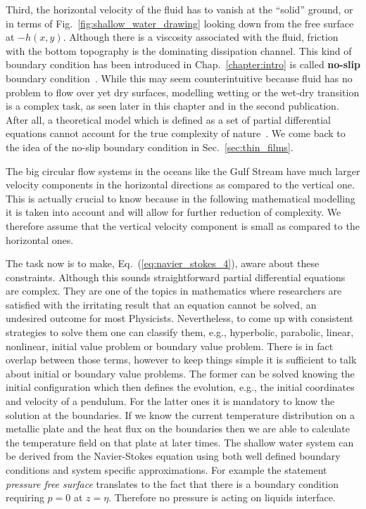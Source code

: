 Third, the horizontal velocity of the fluid has to vanish at the ``solid'' ground, or in terms of Fig.~\ref{fig:shallow_water_drawing} looking down from the free surface at $-h(x,y)$.
Although there is a viscosity associated with the fluid, friction with the bottom topography is the dominating dissipation channel.
This kind of boundary condition has been introduced in Chap.~\ref{chapter:intro} is called \textbf{no-slip} boundary condition~\cite{richardsonNoslipBoundaryCondition1973, degennesFluidWallSlippage2002, salmonLatticeBoltzmannMethod1999}.
While this may seem counterintuitive because fluid has no problem to flow over yet dry surfaces, modelling wetting or the wet-dry transition is a complex task, as seen later in this chapter and in the second publication.
After all, a theoretical model which is defined as a set of partial differential equations cannot account for the true complexity of nature~\cite{scrivenPhysicsApplicationsDIP1988}.
We come back to the idea of the no-slip boundary condition in Sec.~\ref{sec:thin_films}.

The big circular flow systems in the oceans like the Gulf Stream have much larger velocity components in the horizontal directions as compared to the vertical one.  
This is actually crucial to know because in the following mathematical modelling it is taken into account and will allow for further reduction of complexity.
We therefore assume that the vertical velocity component is small as compared to the horizontal ones.

The task now is to make, Eq.~(\ref{eq:navier_stokes_4}), aware about these constraints.
Although this sounds straightforward partial differential equations are complex. 
They are one of the topics in mathematics where researchers are satisfied with the irritating result that an equation cannot be solved, an undesired outcome for most Physicists.
Nevertheless, to come up with consistent strategies to solve them one can classify them, e.g., hyperbolic, parabolic, linear, nonlinear, initial value problem or boundary value problem.
There is in fact overlap between those terms, however to keep things simple it is sufficient to talk about initial or boundary value problems.
The former can be solved knowing the initial configuration which then defines the evolution, e.g., the initial coordinates and velocity of a pendulum. 
For the latter ones it is mandatory to know the solution at the boundaries. 
If we know the current temperature distribution on a metallic plate and the heat flux on the boundaries then we are able to calculate the temperature field on that plate at later times.
The shallow water system can be derived from the Navier-Stokes equation using both well defined boundary conditions and system specific approximations.
For example the statement \textit{pressure free surface} translates to the fact that there is a boundary condition requiring $p = 0$ at $z = \eta$. 
Therefore no pressure is acting on liquids interface.

